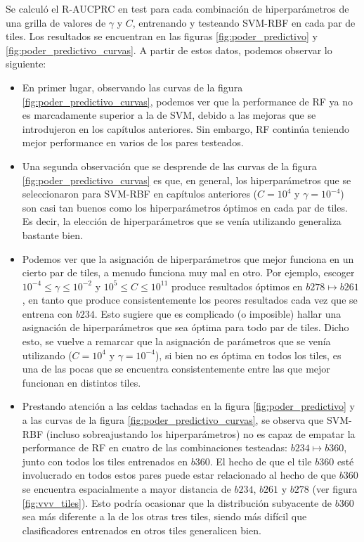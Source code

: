 Se calculó el R-AUCPRC en test para cada combinación de hiperparámetros de una grilla de valores de $\gamma$ y $C$, entrenando y testeando SVM-RBF en cada par de tiles. Los resultados se encuentran en las figuras \ref{fig:poder_predictivo} y \ref{fig:poder_predictivo_curvas}. A partir de estos datos, podemos observar lo siguiente:

\begin{itemize}
\item En primer lugar, observando las curvas de la figura \ref{fig:poder_predictivo_curvas}, podemos ver que la performance de RF ya no es marcadamente superior a la de SVM, debido a las mejoras que se introdujeron en los capítulos anteriores. Sin embargo, RF continúa teniendo mejor performance en varios de los pares testeados.
\item Una segunda observación que se desprende de las curvas de la figura \ref{fig:poder_predictivo_curvas} es que, en general, los hiperparámetros que se seleccionaron para SVM-RBF en capítulos anteriores ($C=10^4$ y $\gamma=10^{-4}$) son casi tan buenos como los hiperparámetros óptimos en cada par de tiles. Es decir, la elección de hiperparámetros que se venía utilizando generaliza bastante bien.
\item Podemos ver que la asignación de hiperparámetros que mejor funciona en un cierto par de tiles, a menudo funciona muy mal en otro. Por ejemplo, escoger $ 10^{-4} \leq \gamma \leq 10^{-2}$ y $ 10^5 \leq C \leq 10^{11}$ produce resultados óptimos en $b278 \mapsto b261$, en tanto que produce consistentemente los peores resultados cada vez que se entrena con $b234$. Esto sugiere que es complicado (o imposible) hallar una asignación de hiperparámetros que sea óptima para todo par de tiles. Dicho esto, se vuelve a remarcar que la asignación de parámetros que se venía utilizando ($C=10^4$ y $\gamma=10^{-4}$), si bien no es óptima en todos los tiles, es una de las pocas que se encuentra consistentemente entre las que mejor funcionan en distintos tiles.
\item Prestando atención a las celdas tachadas en la figura \ref{fig:poder_predictivo} y a las curvas de la figura \ref{fig:poder_predictivo_curvas}, se observa que SVM-RBF (incluso sobreajustando los hiperparámetros) no es capaz de empatar la performance de RF en cuatro de las combinaciones testeadas: $b234 \mapsto b360$, junto con todos los tiles entrenados en $b360$. El hecho de que el tile  $b360$ esté involucrado en todos estos pares puede estar relacionado al hecho de que $b360$ se encuentra espacialmente a mayor distancia de $b234$, $b261$ y $b278$ (ver figura \ref{fig:vvv_tiles}). Esto podría ocasionar que la distribución subyacente de $b360$ sea más diferente a la de los otras tres tiles, siendo más difícil que clasificadores entrenados en otros tiles generalicen bien.
\end{itemize}


